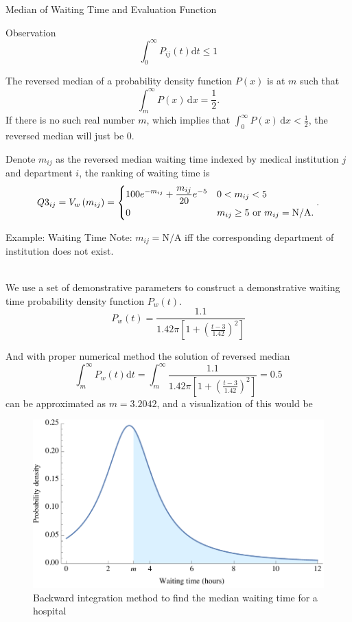 \documentclass[8pt, hyperref={colorlinks=true}]{beamer}
\begin{document}
\begin{frame}{Median of Waiting Time and Evaluation Function}
\begin{block}{Observation}
$$\int_0^\infty P_{ij}\left(t\right) \mathrm{d}t \le 1$$
\end{block}

\begin{definition}
The reversed median of a probability density function $P(x)$ is at $m$ such that
\[
\int_m^\infty P(x)\,\mathrm{d}x=\frac{1}{2}.
\]
If there is no such real number $m$, which implies that $\displaystyle\int_0^\infty P(x)\,\mathrm{d}x<\frac{1}{2}$, the reversed median will just be 0.
\end{definition}

\begin{definition}
Denote $m_{ij}$ as the reversed median waiting time indexed by medical institution $j$ and department $i$, the ranking of waiting time is
\[
Q3_{ij}=V_w\left(m_{ij}\right) =
\begin{dcases}
    100e^{-m_{ij}} + \frac{m_{ij}}{20}e^{-5} & 0 < m_{ij} < 5\\
    0 & m_{ij} \ge 5 \text{ or } m_{ij} = \text{N/A}.
\end{dcases}.
\]
\end{definition}
\end{frame}

\begin{frame}{Example: Waiting Time}
Note: $m_{ij}=\text{N/A}$ iff the corresponding department of institution does not exist.\\~\

We use a set of demonstrative parameters to construct a demonstrative waiting time probability density function $P_w(t)$.
\[
P_w\left(t\right) = \frac{1.1}{1.42\pi \left[1 + \left( \frac{t -3}{1.42}\right)^2\right]}
\]

And with proper numerical method the solution of reversed median
\[
\int_m^{\infty}P_w\left(t\right) \mathrm{d}t =  \int_m^{\infty} \frac{1.1}{1.42\pi \left[1 + \left( \frac{t -3}{1.42}\right)^2\right]} = 0.5
\]
can be approximated as $m = 3.2042$, and a visualization of this would be
\begin{figure}
    \centering
    \includegraphics[scale=0.3]{waiting_time_int.pdf}
    \caption{Backward integration method to find the median waiting time for a hospital}
    \label{fig:waiting_time_int}
\end{figure}
\end{frame}
\end{document}
